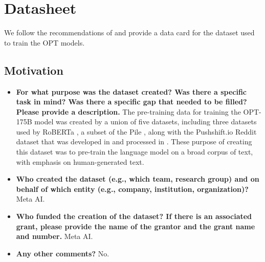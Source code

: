 \section{Datasheet}
\label{sec:datasheet}
We follow the recommendations of \citet{gebru2021} and provide a data card for the dataset used to train the OPT models. 

\subsection{Motivation}
\begin{itemize}
    \item \textbf{For what purpose was the dataset created? Was there a specific task in mind? Was there a specific gap that needed to be filled? Please provide a description.} The pre-training data for training the OPT-175B model was created by a union of five datasets, including three datasets used by RoBERTa \cite{liu2019roberta}, a subset of the Pile \cite{thepile}, along with the Pushshift.io Reddit dataset that was developed in \cite{reddit2020} and processed in \cite{roller-etal-2021-recipes}. These purpose of creating this dataset was to pre-train the language model on a broad corpus of text, with emphasis on human-generated text.
    \item \textbf{Who created the dataset (e.g., which team, research group) and on behalf of which entity (e.g., company, institution, organization)?} Meta AI.
    \item \textbf{Who funded the creation of the dataset? If there is an associated grant, please provide the name of the grantor and the grant name and number.} Meta AI.
    \item \textbf{Any other comments?} No.
\end{itemize}

